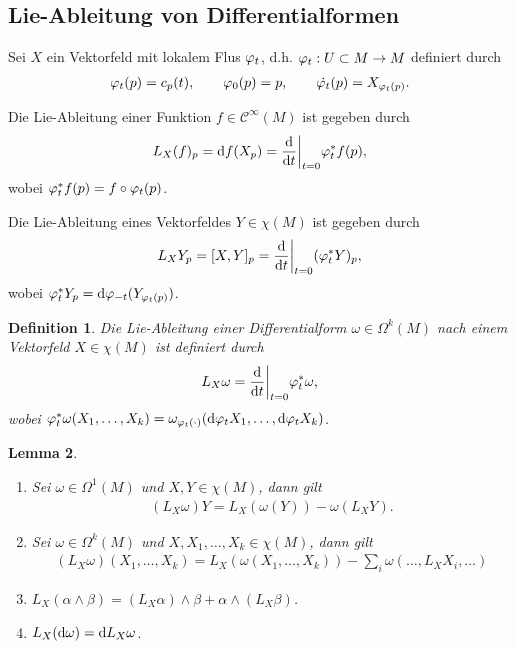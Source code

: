 \documentclass[12pt,a4paper]{article}
\newtheorem{Lemma}{Lemma}[section]
\newtheorem{Definition}[Lemma]{Definition}
\begin{document}
\subsection{Lie-Ableitung von Differentialformen}

Sei $X$ ein Vektorfeld mit lokalem Flus $\varphi_t$, d.h. $\varphi_t: U\subset M\to M$
definiert durch
\begin{align*}
\varphi_t(p) = c_p(t),\qquad \varphi_0(p) = p,\qquad \dot{\varphi_t}(p) = X_{\varphi_t(p)}.
\end{align*}

Die Lie-Ableitung einer Funktion $f\in\mathcal C^\infty(M)$ ist gegeben durch
\begin{align*}
L_X(f)_p = \mathrm{d}f(X_p) = \frac{\mathrm{d}}{\mathrm{d}t}\bigg|_{t=0} \varphi_t^*f(p),
\end{align*}
wobei $\varphi_t^*f(p) = f\circ\varphi_t(p)$.
\medskip

Die Lie-Ableitung eines Vektorfeldes $Y\in\chi(M)$ ist gegeben durch
\begin{align*}
L_X Y_p = [X,Y]_p = \frac{\mathrm{d}}{\mathrm{d}t}\bigg|_{t=0} (\varphi_t^* Y)_{p},
\end{align*}
wobei $\varphi_t^* Y_p = \mathrm{d}\varphi_{-t}(Y_{\varphi_t(p)})$.

\bigskip

\begin{Definition}
Die \emph{Lie-Ableitung} einer Differentialform $\omega\in\Omega^k(M)$ nach
einem Vektorfeld $X\in\chi(M)$ ist definiert durch
\begin{align*}
L_X\omega = \frac{\mathrm{d}}{\mathrm{d}t}\bigg|_{t=0} \varphi_t^*\omega,
\end{align*}
wobei $\varphi_t^*\omega (X_1,\ldots,X_k) 
=\omega_{\varphi_t(\cdot)}(\mathrm{d}\varphi_{t}X_1,\ldots,\mathrm{d}\varphi_t X_k)$.
\end{Definition}

\bigskip

\begin{Lemma}
\begin{enumerate}
  \item Sei $\omega\in\Omega^1(M)$ und $X,Y\in\chi(M)$, dann gilt
\begin{align*}
(L_X\omega)Y = L_X(\omega(Y)) - \omega(L_XY).
\end{align*}
\item Sei $\omega\in\Omega^k(M)$ und $X,X_1,\ldots,X_k\in\chi(M)$, dann gilt
\begin{align*}
(L_X\omega)(X_1,\ldots,X_k) = L_X(\omega(X_1,\ldots,X_k))-\sum_i
\omega(\ldots,L_X X_i,\ldots)
\end{align*}
\item $L_X(\alpha\wedge\beta) = (L_X\alpha) \wedge \beta + \alpha\wedge
(L_X\beta)$.
\item $L_X(\mathrm{d}\omega) = \mathrm{d} L_X\omega$.
\end{enumerate}
\end{Lemma}
\end{document}
